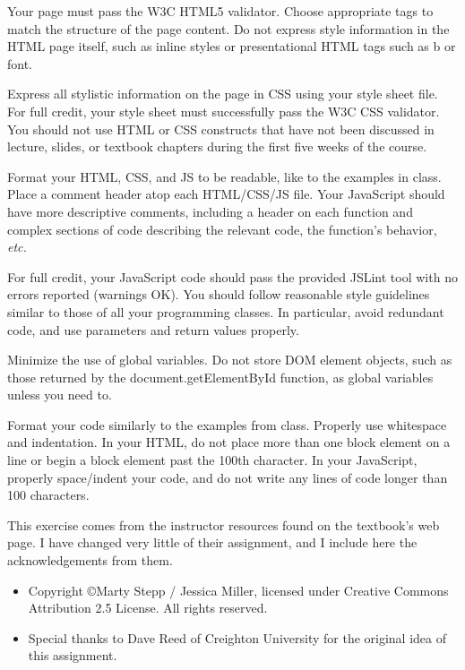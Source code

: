 \documentclass{article}
\newcommand{\myitem}[1]{\noindent\hspace{-.25in}{\large\bf #1}}
\begin{document}
\myitem{Implementation and Grading:}

Your page must
pass the W3C HTML5 validator.  Choose appropriate tags to match the
structure of the page content.  Do not express style information in
the HTML page itself, such as inline styles or presentational HTML
tags such as b or font.

Express all stylistic information on the page in CSS using your style
sheet file.  For full credit, your style sheet must successfully pass
the W3C CSS validator.  You should not use HTML or CSS constructs that
have not been discussed in lecture, slides, or textbook chapters
during the first five weeks of the course.  

Format your HTML, CSS, and JS to be readable, like to the examples in
class. Place a comment header atop each HTML/CSS/JS file.  Your
JavaScript should have more descriptive comments, including a header
on each function and complex sections of code describing the relevant
code, the function's behavior, {\em etc.}

For full credit, your JavaScript code should pass the provided JSLint
tool with no errors reported (warnings OK).  You should follow
reasonable style guidelines similar to those of all your programming
classes.  In particular, avoid redundant code, and use parameters and
return values properly.

Minimize the use of global variables.  Do not store DOM element
objects, such as those returned by the document.getElementById
function, as global variables unless you need to.

Format your code similarly to the examples from class.  Properly use
whitespace and indentation.  In your HTML, do not place more than one
block element on a line or begin a block element past the 100th
character.  In your JavaScript, properly space/indent your code, and
do not write any lines of code longer than 100 characters.



\myitem{Acknowledgements:} This exercise comes from the instructor
resources found on the textbook's web page.  I have changed very
little of their assignment, and I include here the acknowledgements
from them.
\begin{itemize}
  \item
Copyright \copyright Marty Stepp / Jessica Miller, licensed under Creative Commons Attribution 2.5 License.  All rights reserved.
\item
Special
thanks to Dave Reed of Creighton University for the original idea of
this assignment.
 \end{itemize}
\end{document}
